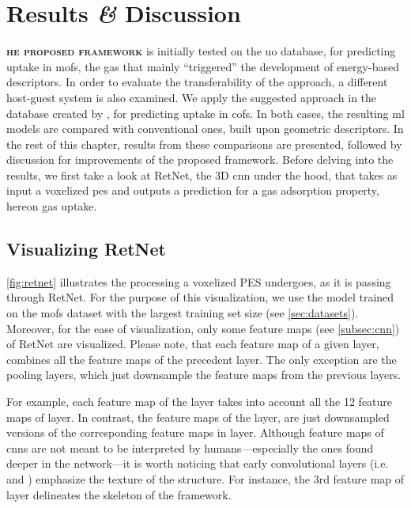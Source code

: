 \chapter{Results \textit{\&} Discussion}

\lettrine[
	nindent=0em, findent=0.5em, loversize=-0.12, lines=5
]{}{\bfseries\color{Blue}he proposed framework} is initially
tested on the \gls{uo} database, for predicting  uptake in \glspl{mof},
the gas that mainly ``triggered'' the development of energy-based
descriptors. In order to evaluate the
transferability of the approach, a different host-guest system is also examined.
We apply the suggested approach in the database created by
\textcite{Mercado_2018}, for predicting  uptake in \glspl{cof}. In both
cases, the resulting \gls{ml} models are compared with conventional ones, built
upon geometric descriptors. In the rest of this
chapter, results from these comparisons are presented, followed by discussion
for improvements of the proposed framework. Before delving into the results, we
first take a look at RetNet, the 3D \gls{cnn} under the hood, that
takes as input a voxelized \gls{pes} and outputs a
prediction for a gas adsorption property, hereon gas
uptake.

\section{Visualizing RetNet}

\Figure{} \ref{fig:retnet} illustrates the processing a voxelized PES undergoes, as
it is passing through RetNet. For the purpose of this visualization, we use the
model trained on the \glspl{mof} dataset with the largest training set size (see
\Section{} \ref{sec:datasets}). Moreover, for the ease of visualization, only some
feature maps (see \Section{} \ref{subsec:cnn}) of RetNet are visualized. Please
note, that each feature map of a given layer, combines all
the feature maps of the precedent layer. The only exception are the pooling
layers, which just downsample the feature
maps from the previous layers.

For example, each feature map of the  layer takes into account all the
12 feature maps of  layer. In contrast, the feature maps of the 
layer, are just downsampled versions of the corresponding feature maps in
 layer. Although feature maps of \glspl{cnn} are not meant to be
interpreted by humans---especially the ones found deeper in the network---it is
worth noticing that early convolutional layers (i.e.
 and ) emphasize the texture of the structure. For instance, the
3rd feature map of  layer delineates the skeleton of the framework.

